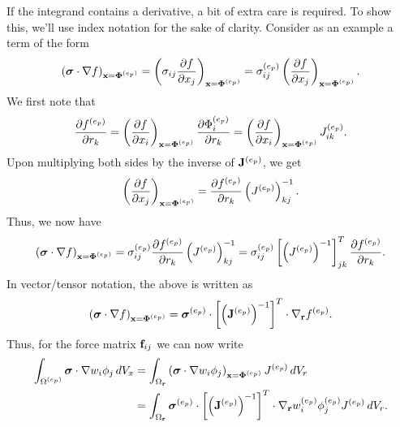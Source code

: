 \documentclass[11pt]{report}
\begin{document}
If the integrand contains a derivative, a bit of extra care is required. To show this, we'll use index notation for the sake of clarity. Consider as an example a term of the form
\begin{equation*}
    \left ( \bm \sigma \cdot \nabla f \right )_{\mathbf{x}=\bm \Phi^{(e_p)}}= \left ( \sigma_{ij} \frac{\partial f}{\partial x_j} \right )_{\mathbf{x} = \bm \Phi^{(e_p)}}= \sigma_{ij}^{(e_p)} \left ( \frac{\partial f}{\partial x_j} \right )_{\mathbf{x} = \bm \Phi^{(e_p)}}.
\end{equation*}
We first note that
\begin{equation*}
    \frac{\partial f^{(e_p)}}{\partial r_k} = \left( \frac{\partial f}{\partial x_i} \right)_{\mathbf{x} = \bm \Phi^{(e_p)}} \frac{\partial \Phi^{(e_p)}_i}{\partial r_k} = \left ( \frac{\partial f}{\partial x_i} \right )_{\mathbf{x} = \bm \Phi^{(e_p)}} J^{(e_p)}_{ik}.
\end{equation*}
Upon multiplying both sides by the inverse of $\mathbf{J}^{(e_p)}$, we get
\begin{equation*}
    \left ( \frac{\partial f}{\partial x_j} \right )_{\mathbf{x} = \bm \Phi^{(e_p)}} = \frac{\partial f^{(e_p)}}{\partial r_k} \left( J^{(e_p)} \right)^{-1}_{kj}.
\end{equation*}
Thus, we now have
\begin{equation*}
    \left ( \bm \sigma \cdot \nabla f \right )_{\mathbf{x}=\bm \Phi^{(e_p)}} = \sigma^{(e_p)}_{ij}\frac{\partial f^{(e_p)}}{\partial r_k} \left( J^{(e_p)} \right)^{-1}_{kj} = \sigma^{(e_p)}_{ij} \left[ \left( J^{(e_p)} \right)^{-1} \right]^T_{jk} \frac{\partial f^{(e_p)}}{\partial r_k}.
\end{equation*}
In vector/tensor notation, the above is written as
\begin{equation*}
    \left ( \bm \sigma \cdot \nabla f \right )_{\mathbf{x}=\bm \Phi^{(e_p)}} = \bm \sigma^{(e_p)} \cdot \left[ \left( \mathbf{J}^{(e_p)} \right)^{-1} \right]^T \cdot \nabla_{\mathbf{r}} f^{(e_p)}.
\end{equation*}
Thus, for the force matrix $\mathbf{f}_{ij}$ we can now write
\begin{align*}
    \int_{\Omega^{(e_p)}} \bm \sigma \cdot \nabla w_i \phi_j \, dV_x &= \int_{\Omega_{\mathbf{r}}} \left ( \bm \sigma \cdot \nabla w_i \phi_j \right )_{\mathbf{x}=\bm \Phi^{(e_p)}} J^{(e_p)} \, dV_r \nonumber \\
    &= \int_{\Omega_{\mathbf{r}}} \bm \sigma^{(e_p)} \cdot \left[ \left( \mathbf{J}^{(e_p)} \right)^{-1} \right]^T  \cdot \nabla_{\mathbf{r}} w^{(e_p)}_i \phi^{(e_p)}_j J^{(e_p)} \, dV_r.
\end{align*}
\end{document}
